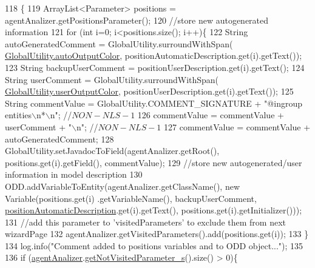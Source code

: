 \begin{DoxyCode}
118                                     \{ 
119         ArrayList<Parameter> positions = agentAnalizer.getPositionsParameter();
120         \textcolor{comment}{//store new autogenerated information}
121         \textcolor{keywordflow}{for} (\textcolor{keywordtype}{int} i=0; i<positions.size(); i++)\{
122             String autoGeneratedComment = GlobalUtility.surroundWithSpan(
      \hyperlink{classit_1_1isislab_1_1masonassisteddocumentation_1_1mason_1_1analizer_1_1_global_utility_a2e086c8a2d8edf16b2eaf90408832adc}{GlobalUtility.autoOutputColor}, positionAutomaticDescription.get(i).getText());
123             String backupUserComment = positionUserDescription.get(i).getText();
124             String userComment = GlobalUtility.surroundWithSpan(
      \hyperlink{classit_1_1isislab_1_1masonassisteddocumentation_1_1mason_1_1analizer_1_1_global_utility_a0fcb324ae33eb93bd5b9177e342ecc82}{GlobalUtility.userOutputColor}, positionUserDescription.get(i).getText());
125             String commentValue = GlobalUtility.COMMENT\_SIGNATURE + \textcolor{stringliteral}{"@ingroup entities\(\backslash\)n*\(\backslash\)n"}; \textcolor{comment}{//$NON-NLS-1$}
126             commentValue = commentValue + userComment + \textcolor{stringliteral}{"\(\backslash\)n"}; \textcolor{comment}{//$NON-NLS-1$}
127             commentValue = commentValue + autoGeneratedComment;
128             GlobalUtility.setJavadocToField(agentAnalizer.getRoot(), positions.get(i).getField(), 
      commentValue);
129             \textcolor{comment}{//store new autogenerated/user information in model description}
130             ODD.addVariableToEntity(agentAnalizer.getClassName(), \textcolor{keyword}{new} Variable(positions.get(i)
      .getVariableName(), backupUserComment, \hyperlink{classit_1_1isislab_1_1masonassisteddocumentation_1_1mason_1_1wizards_1_1_e___agent_position_page_a3897e4e6c9669b071dccebca53188b08}{positionAutomaticDescription}.get(i).getText(), 
      positions.get(i).getInitializer()));
131             \textcolor{comment}{//add this parameter to 'visitedParameters' to exclude them from next wizardPage}
132             agentAnalizer.getVisitedParameters().add(positions.get(i));
133         \}
134         log.info(\textcolor{stringliteral}{"Comment added to positions variables and to ODD object..."}); 
135         
136         \textcolor{keywordflow}{if} (\hyperlink{classit_1_1isislab_1_1masonassisteddocumentation_1_1mason_1_1wizards_1_1_e___agent_position_page_a2fe88598fc7248012ccf5298134f0196}{agentAnalizer}.\hyperlink{classit_1_1isislab_1_1masonassisteddocumentation_1_1mason_1_1analizer_1_1_agent_analizer_ad237f6e49d6d49e0138b1e2ac6a2b0bb}{getNotVisitedParameter\_s}().size() > 0)\{

\end{DoxyCode}
